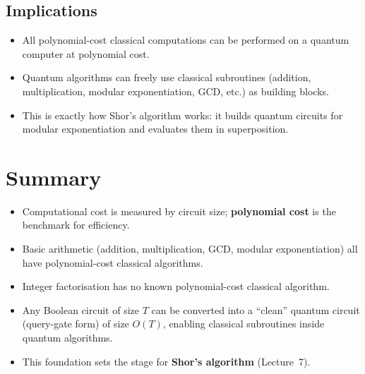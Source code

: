 \documentclass[11pt]{article}
\theoremstyle{definition}
\begin{document}
\subsection{Implications}

\begin{itemize}
    \item All polynomial-cost classical computations can be performed on a quantum computer at polynomial cost.
    \item Quantum algorithms can freely use classical subroutines (addition, multiplication, modular exponentiation, GCD, etc.) as building blocks.
    \item This is exactly how Shor's algorithm works: it builds quantum circuits for modular exponentiation and evaluates them in superposition.
\end{itemize}

\section{Summary}

\begin{itemize}
    \item Computational cost is measured by circuit size; \textbf{polynomial cost} is the benchmark for efficiency.
    \item Basic arithmetic (addition, multiplication, GCD, modular exponentiation) all have polynomial-cost classical algorithms.
    \item Integer factorisation has no known polynomial-cost classical algorithm.
    \item Any Boolean circuit of size $T$ can be converted into a ``clean'' quantum circuit (query-gate form) of size $O(T)$, enabling classical subroutines inside quantum algorithms.
    \item This foundation sets the stage for \textbf{Shor's algorithm} (Lecture~7).
\end{itemize}
\end{document}
